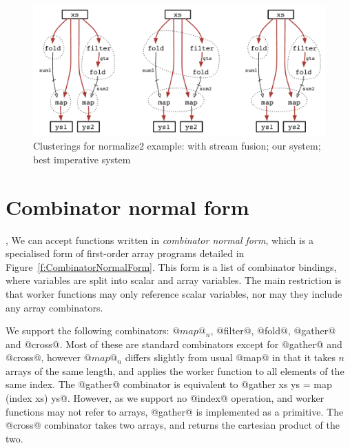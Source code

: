 
\begin{figure}[ht!]
\begin{center}
\includegraphics[scale=0.5]{figures/ex1-compare.pdf}
\end{center}

\caption{Clusterings for normalize2 example: with stream fusion; our system; best imperative system}
\label{f:normalize2-cluterings}
\end{figure}


\section{Combinator normal form}
,  
We can accept functions written in \emph{combinator normal form}, which is a specialised form of first-order array programs detailed in Figure~\ref{f:CombinatorNormalForm}.
This form is a list of combinator bindings, where variables are split into scalar and array variables.
The main restriction is that worker functions may only reference scalar variables, nor may they include any array combinators.

We support the following combinators: $@map@_n$, @filter@, @fold@, @gather@ and @cross@.
Most of these are standard combinators except for @gather@ and @cross@, however $@map@_n$ differs slightly from usual @map@ in that it takes $n$ arrays of the same length, and applies the worker function to all elements of the same index.
The @gather@ combinator is equivalent to @gather xs ys = map (index xs) ys@.
However, as we support no @index@ operation, and worker functions may not refer to arrays, @gather@ is implemented as a primitive.
The @cross@ combinator takes two arrays, and returns the cartesian product of the two.


